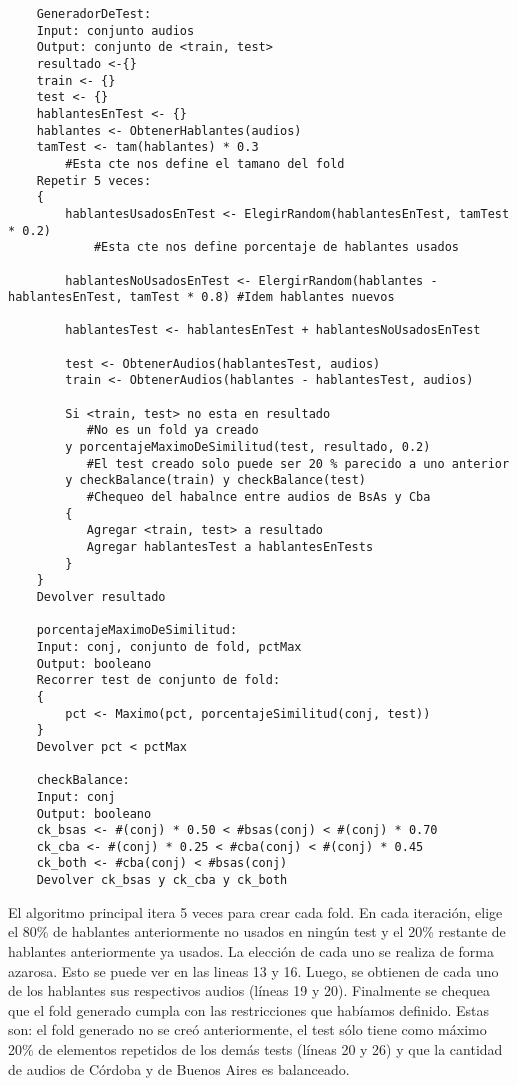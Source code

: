 \begin{lstlisting}
    GeneradorDeTest:
    Input: conjunto audios
    Output: conjunto de <train, test>
    resultado <-{}
    train <- {}
    test <- {}
    hablantesEnTest <- {}
    hablantes <- ObtenerHablantes(audios)
    tamTest <- tam(hablantes) * 0.3 
        #Esta cte nos define el tamano del fold
    Repetir 5 veces:
    {
        hablantesUsadosEnTest <- ElegirRandom(hablantesEnTest, tamTest * 0.2) 
            #Esta cte nos define porcentaje de hablantes usados
    
        hablantesNoUsadosEnTest <- ElergirRandom(hablantes - hablantesEnTest, tamTest * 0.8) #Idem hablantes nuevos
    
        hablantesTest <- hablantesEnTest + hablantesNoUsadosEnTest

        test <- ObtenerAudios(hablantesTest, audios)
        train <- ObtenerAudios(hablantes - hablantesTest, audios)

        Si <train, test> no esta en resultado 
           #No es un fold ya creado
        y porcentajeMaximoDeSimilitud(test, resultado, 0.2) 
           #El test creado solo puede ser 20 % parecido a uno anterior
        y checkBalance(train) y checkBalance(test) 
           #Chequeo del habalnce entre audios de BsAs y Cba
        {
           Agregar <train, test> a resultado
           Agregar hablantesTest a hablantesEnTests
        }
    }
    Devolver resultado
    
    porcentajeMaximoDeSimilitud:
    Input: conj, conjunto de fold, pctMax
    Output: booleano
    Recorrer test de conjunto de fold:
    {
        pct <- Maximo(pct, porcentajeSimilitud(conj, test))
    }
    Devolver pct < pctMax

    checkBalance:
    Input: conj
    Output: booleano
    ck_bsas <- #(conj) * 0.50 < #bsas(conj) < #(conj) * 0.70
    ck_cba <- #(conj) * 0.25 < #cba(conj) < #(conj) * 0.45
    ck_both <- #cba(conj) < #bsas(conj)
    Devolver ck_bsas y ck_cba y ck_both
\end{lstlisting}

El algoritmo principal itera 5 veces para crear cada fold. En cada iteración, elige el 80\% de hablantes anteriormente no usados en ningún test y el 20\% restante de hablantes anteriormente ya usados. La elección de cada uno se realiza de forma azarosa. Esto se puede ver en las lineas 13 y 16. Luego, se obtienen de cada uno de los hablantes sus respectivos audios (líneas 19 y 20). Finalmente se chequea que el fold generado cumpla con las restricciones que habíamos definido. Estas son: el fold generado no se creó anteriormente, el test sólo tiene como máximo 20\% de elementos repetidos de los demás tests (líneas 20 y 26) y que la cantidad de audios de Córdoba y de Buenos Aires es balanceado.

